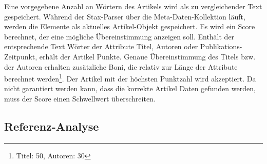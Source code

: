 Eine vorgegebene Anzahl an Wörtern des Artikels wird als zu
vergleichender Text gespeichert. Während der Stax-Parser über die
Meta-Daten-Kollektion läuft, werden die Elemente als aktuelles 
Artikel-Objekt gespeichert. Es wird ein Score berechnet, der eine
mögliche Übereinstimmung anzeigen soll. Enthält der entsprechende Text Wörter der
Attribute Titel, Autoren oder Publikations-Zeitpunkt, erhält der Artikel Punkte. Genaue Übereinstimmung des
Titels bzw. der Autoren erhalten zusätzliche Boni, die relativ zur
Länge der Attribute berechnet werden\footnote{Titel: 50, Autoren:
  30}. Der Artikel mit der höchsten Punktzahl wird akzeptiert. Da
nicht garantiert werden kann, dass die korrekte Artikel Daten gefunden
werden, muss der Score einen Schwellwert überschreiten.

\subsection{Referenz-Analyse}\label{sec:reference-analysis}






